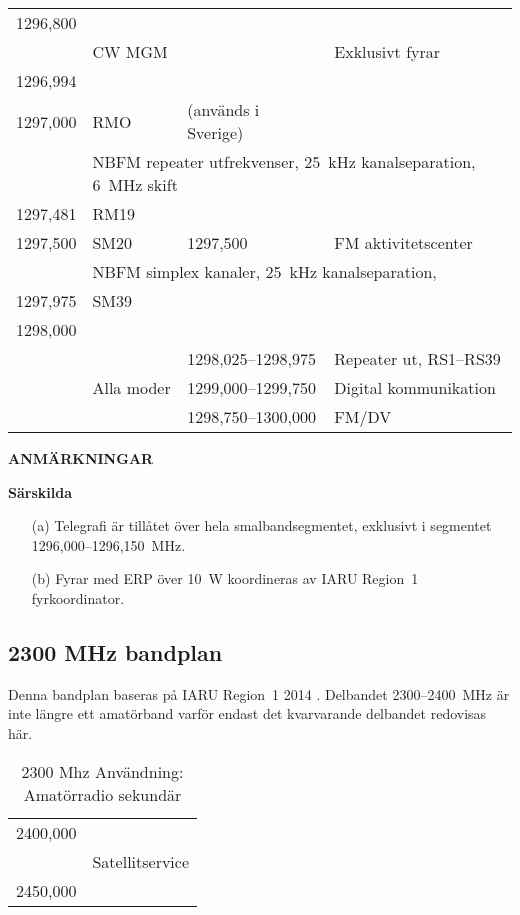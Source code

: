 \begin{longtable}{llll}
1296,800 & & & \\
         & CW MGM & & Exklusivt fyrar\\
1296,994 & & & \\
1297,000 & RMO & (används i Sverige) & \\
         & \multicolumn{3}{l}{NBFM repeater utfrekvenser, 25~kHz kanalseparation, 6~MHz skift} \\
1297,481 & RM19 & & \\
1297,500 & SM20 & 1297,500 & FM aktivitetscenter \\
         & \multicolumn{3}{l}{NBFM simplex kanaler, 25~kHz kanalseparation,}\\
1297,975 & SM39 & & \\
1298,000 & & & \\
         &            & 1298,025--1298,975 & Repeater ut, RS1--RS39\\
         & Alla moder & 1299,000--1299,750 & Digital kommunikation \\
         &            & 1298,750--1300,000 & FM/DV\\
\end{longtable}

\textbf{ANMÄRKNINGAR}

\textbf{Särskilda}

\begin{itemize}
\item[(a)] Telegrafi är tillåtet över hela smalbandsegmentet, exklusivt
i segmentet 1296,000--1296,150~MHz.
\item[(b)] Fyrar med ERP över 10~W koordineras av IARU Region~1 fyrkoordinator.
\end{itemize}

\subsection{2300 MHz bandplan}
\label{2300MHzbandplan}
Denna bandplan baseras på IARU Region~1 2014 \cite{IARU1}.
Delbandet 2300--2400~MHz är inte längre ett amatörband varför endast det
kvarvarande delbandet redovisas här.
 
\setlongtables
\begin{longtable}{llll}
\caption{2300 Mhz Användning: Amatörradio sekundär}\\
2400,000 & & & \\
         & \multicolumn{3}{l}{Satellitservice} \\
2450,000 & & & \\
\end{longtable}

